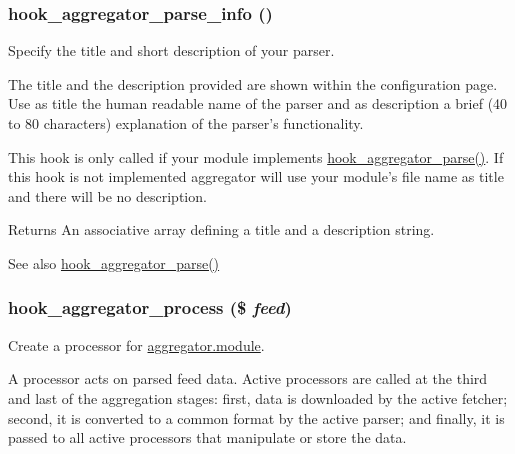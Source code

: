 \hypertarget{group__hooks_ga4cf79b336cf009dee9487ae9d2249d9d}{
\subsubsection[{hook\_\-aggregator\_\-parse\_\-info}]{\setlength{\rightskip}{0pt plus 5cm}hook\_\-aggregator\_\-parse\_\-info ()}}
\label{group__hooks_ga4cf79b336cf009dee9487ae9d2249d9d}
Specify the title and short description of your parser.

The title and the description provided are shown within the configuration page. Use as title the human readable name of the parser and as description a brief (40 to 80 characters) explanation of the parser's functionality.

This hook is only called if your module implements \hyperlink{group__hooks_gae27163e729bb531cc527ec6f0ad16943}{hook\_\-aggregator\_\-parse()}. If this hook is not implemented aggregator will use your module's file name as title and there will be no description.

\begin{DoxyReturn}{Returns}
An associative array defining a title and a description string.
\end{DoxyReturn}
\begin{DoxySeeAlso}{See also}
\hyperlink{group__hooks_gae27163e729bb531cc527ec6f0ad16943}{hook\_\-aggregator\_\-parse()} 
\end{DoxySeeAlso}
\hypertarget{group__hooks_gaf5da0f420ab3b27c1bc33f339c979ac7}{
\subsubsection[{hook\_\-aggregator\_\-process}]{\setlength{\rightskip}{0pt plus 5cm}hook\_\-aggregator\_\-process (\$ {\em feed})}}
\label{group__hooks_gaf5da0f420ab3b27c1bc33f339c979ac7}
Create a processor for \hyperlink{aggregator_8module}{aggregator.module}.

A processor acts on parsed feed data. Active processors are called at the third and last of the aggregation stages: first, data is downloaded by the active fetcher; second, it is converted to a common format by the active parser; and finally, it is passed to all active processors that manipulate or store the data.

